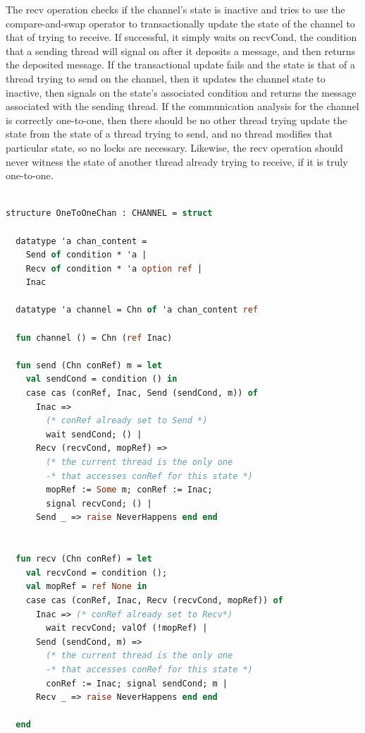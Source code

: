 \documentclass{article}
\begin{document}
The recv operation checks if the channel's state is inactive and tries to use the
compare-and-swap operator to transactionally update the state of the channel to that of trying
to receive.  If successful, it simply waits on recvCond, the condition that a sending thread
will signal on after it deposits a message, and then returns the deposited message.  If the
transactional update fails and the state is that of a thread trying to send on the channel,
then it updates the channel state to inactive, then signals on the state's associated
condition and returns the message associated with the sending thread.  If the communication
analysis for the channel is correctly one-to-one, then there should be no other thread trying
update the state from the state of a thread trying to send, and no thread modifies that
particular state, so no locks are necessary.  Likewise, the recv operation should never
witness the state of another thread already trying to receive, if it is truly one-to-one.

\begin{lstlisting}[language=ML, escapechar=\%]

structure OneToOneChan : CHANNEL = struct

  datatype 'a chan_content =
    Send of condition * 'a |
    Recv of condition * 'a option ref |
    Inac  

  datatype 'a channel = Chn of 'a chan_content ref

  fun channel () = Chn (ref Inac)

  fun send (Chn conRef) m = let
    val sendCond = condition () in
    case cas (conRef, Inac, Send (sendCond, m)) of
      Inac => 
        (* conRef already set to Send *)
        wait sendCond; () |
      Recv (recvCond, mopRef) =>
        (* the current thread is the only one
        -* that accesses conRef for this state *)
        mopRef := Some m; conRef := Inac;
        signal recvCond; () |
      Send _ => raise NeverHappens end end


  fun recv (Chn conRef) = let
    val recvCond = condition ();
    val mopRef = ref None in
    case cas (conRef, Inac, Recv (recvCond, mopRef)) of
      Inac => (* conRef already set to Recv*)
        wait recvCond; valOf (!mopRef) |
      Send (sendCond, m) =>
        (* the current thread is the only one
        -* that accesses conRef for this state *)
        conRef := Inac; signal sendCond; m |
      Recv _ => raise NeverHappens end end 

  end
  \end{lstlisting}
\end{document}
